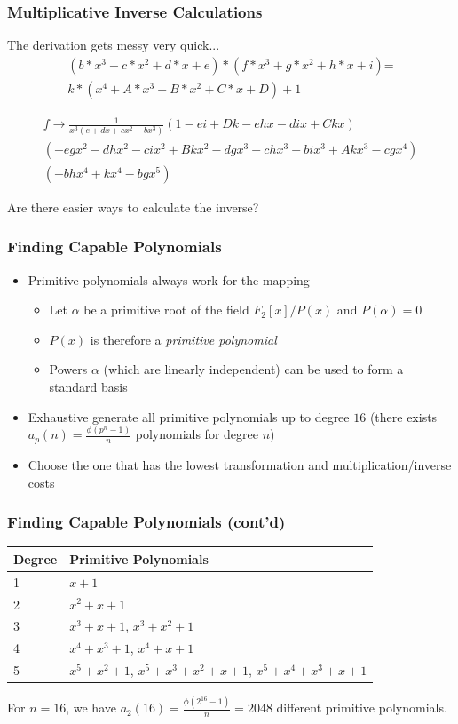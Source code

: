 \documentclass[handout]{beamer}
\begin{document}
\begin{frame}
	\frametitle{Multiplicative Inverse Calculations}
	The derivation gets messy very quick...
	\begin{align*}
	(b*x^3+c*x^2+d*x+e)*(f*x^3+g*x^2+h*x+i)\text{=}\\
	k*(x^4+A*x^3+B*x^2+C*x+D)+1
	\end{align*}
	
	\begin{align*}
	f \to \frac{1}{x^3 \left(e+d x+c x^2+b x^3\right)}\left(1-e i+D k-e h x-d i x+C k x\right) \\ \left(-e g x^2-d h x^2-c i x^2+B k x^2-d g x^3-c
h x^3-b i x^3+A k x^3-c g x^4\right) \\ \left(-b h x^4+k x^4-b g x^5\right)
	\end{align*}
	\begin{center}
		Are there easier ways to calculate the inverse?
	\end{center}
\end{frame}

\begin{frame}
	\frametitle{Finding Capable Polynomials}
	\begin{itemize}
		\item Primitive polynomials always work for the mapping
		\begin{itemize}
			\item Let $\alpha$ be a primitive root of the field $F_2[x]/P(x)$ and $P(\alpha) = 0$
			\item $P(x)$ is therefore a \emph{primitive polynomial}
			\item Powers $\alpha$ (which are linearly independent) can be used to form a standard basis
		\end{itemize} 
		\item Exhaustive generate all primitive polynomials up to degree $16$ (there exists $a_p(n) = \frac{\phi(p^n - 1)}{n}$ polynomials for degree $n$)
		\item Choose the one that has the lowest transformation and multiplication/inverse costs
	\end{itemize}
\end{frame}

\begin{frame}
	\frametitle{Finding Capable Polynomials (cont'd)}
	\begin{table}
		\begin{tabular}{|l|l|}
		\hline
		Degree & Primitive Polynomials  \\ \hline
		1 & $x + 1$  \\ 
		2 & $x^2 + x + 1$  \\
		3 & $x^3 + x + 1$, $x^3 + x^2 + 1$  \\
		4 & $x^4 + x^3 + 1$, $x^4 + x + 1$  \\
		5 & $x^5 + x^2 + 1$, $x^5 + x^3 + x^2 + x + 1$, $x^5 + x^4 + x^3 + x + 1$ \\
		\hline
		\end{tabular}
	\end{table}
	For $n = 16$, we have $a_2(16) = \frac{\phi(2^16 - 1)}{n} = 2048$ different primitive polynomials.
\end{frame}
\end{document}
